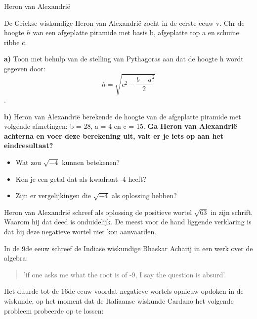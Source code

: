 \documentclass{ximera}
\begin{document}

\begin{exercise}{Heron van Alexandrië}

    De Griekse wiskundige Heron van Alexandrië zocht in de eerste eeuw v. Chr de hoogte \(h\) van een afgeplatte piramide met basis b, afgeplatte top a en schuine ribbe c. 

    \textbf{a)} 
    Toon met behulp van de stelling van Pythagoras aan dat de hoogte h wordt gegeven door: \[h = \sqrt{c^2 - {\frac{b-a}{2}}^2}\]. 

    \textbf{b)} 
    Heron van Alexandrië berekende de hoogte van de afgeplatte piramide met volgende afmetingen: b = 28, a = 4 en c = 15. 
    \textbf{Ga Heron van Alexandrië achterna en voer deze berekening uit, valt er je iets op aan het eindresultaat? }

\end{exercise}



\begin{denkvraag*}{}
\begin{itemize}
    \item Wat zou \(\sqrt{-4}\) kunnen betekenen? 
    \item Ken je een getal dat als kwadraat -4 heeft? 
    \item Zijn er vergelijkingen die \(\sqrt{-4}\) als oplossing hebben? 
\end{itemize}
\end{denkvraag*}

Heron van Alexandrië schreef als oplossing de positieve wortel \(\sqrt{63}\) in zijn schrift. 
Waarom hij dat deed is onduidelijk.
De meest voor de hand liggende verklaring is dat hij deze negatieve wortel niet kon aanvaarden. 

In de 9de eeuw schreef de Indiase wiskundige Bhaskar Acharij in een werk over de algebra: 

\begin{quote}
    'if one asks me what the root is of -9, I say the question is absurd'. 
\end{quote}
 

Het duurde tot de 16de eeuw voordat negatieve wortels opnieuw opdoken in de wiskunde, op het moment dat de Italiaanse wiskunde Cardano het volgende probleem probeerde op te lossen: 
\end{document}
